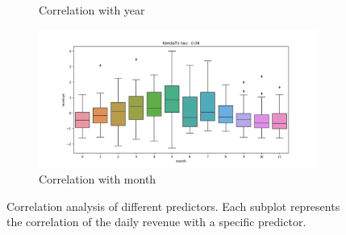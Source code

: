 \begin{figure}[h!]
\begin{subfigure}[b]{0.3\textwidth}
        \caption{Correlation with year}
        \label{fig:corr_year}
    \end{subfigure}
    \begin{subfigure}[b]{0.3\textwidth}
        \includegraphics[width=\textwidth]{../../preprocessing/plots/month.png}
        \caption{Correlation with month}
        \label{fig:corr_year}
    \end{subfigure}
    \caption{Correlation analysis of different predictors. Each subplot represents the correlation of the daily revenue with a specific predictor.}
    \label{fig:corr_analysis}
\end{figure}

